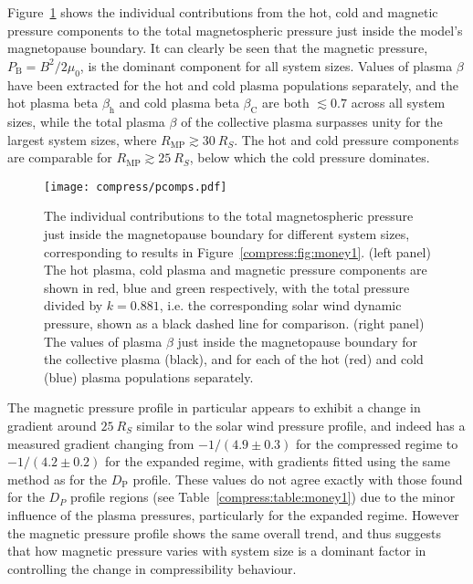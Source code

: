 Figure~\ref{compress:fig:pcomps} shows the individual contributions from the hot, cold and magnetic pressure components to the total magnetospheric pressure just inside the model's magnetopause boundary. It can clearly be seen that the magnetic pressure, $P_\mathrm{B}=B^2/2\mu_0$, is the dominant component for all system sizes. Values of plasma $\beta$ have been extracted for the hot and cold plasma populations separately, and the hot plasma beta $\beta_\mathrm{h}$ and cold plasma beta $\beta_\mathrm{C}$ are both $\lesssim 0.7$ across all system sizes, while the total plasma $\beta$ of the collective plasma surpasses unity for the largest system sizes, where $R_\mathrm{MP} \gtrsim \SI{30}{R_S}$. The hot and cold pressure components are comparable for $R_\mathrm{MP} \gtrsim \SI{25}{R_S}$, below which the cold pressure dominates. 
\begin{figure}
\centering
\noindent\texttt{[image: compress/pcomps.pdf]}
\caption[Pressure components and plasma $\beta$ just inside the magnetopause boundary for typical $K_\mathrm{H}$.]{The individual contributions to the total magnetospheric pressure just inside the magnetopause boundary for different system sizes, corresponding to results in Figure~\ref{compress:fig:money1}. (left panel) The hot plasma, cold plasma and magnetic pressure components are shown in red, blue and green respectively, with the total pressure divided by $k=0.881$, i.e. the corresponding solar wind dynamic pressure, shown as a black dashed line for comparison. (right panel) The values of plasma $\beta$ just inside the magnetopause boundary for the collective plasma (black), and for each of the hot (red) and cold (blue) plasma populations separately.}
\label{compress:fig:pcomps}
\end{figure}
 
The magnetic pressure profile in particular appears to exhibit a change in gradient around $\SI{25}{R_S}$ similar to the solar wind pressure profile, and indeed has a measured gradient changing from $-1/(4.9 \pm 0.3)$ for the compressed regime to $ -1/(4.2 \pm 0.2)$ for the expanded regime, with gradients fitted using the same method as for the $D_\mathrm{P}$ profile. These values do not agree exactly with those found for the $D_{P}$ profile regions (see Table~\ref{compress:table:money1}) due to the minor influence of the plasma pressures, particularly for the expanded regime. However the magnetic pressure profile shows the same overall trend, and thus suggests that how magnetic pressure varies with system size is a dominant factor in controlling the change in compressibility behaviour.
 

